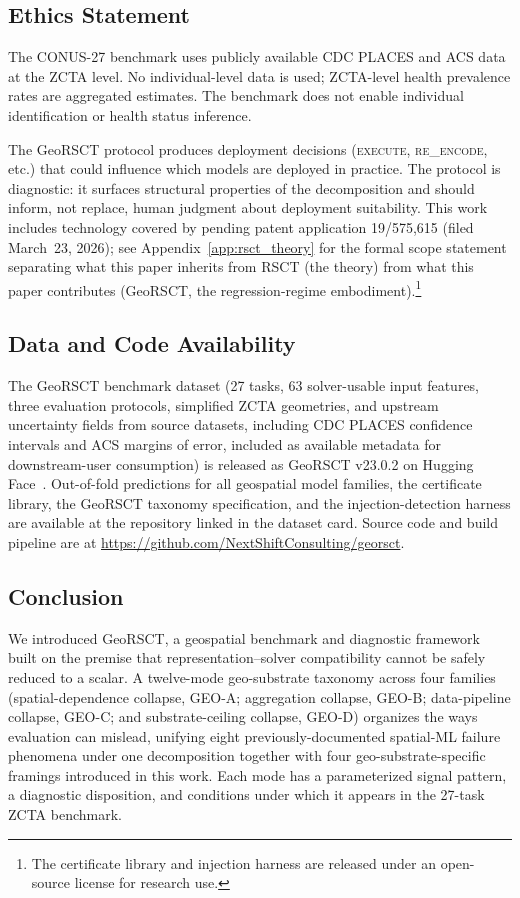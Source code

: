 \documentclass{article}
\begin{document}
\subsection{Ethics Statement}

The CONUS-27 benchmark uses publicly available CDC PLACES and ACS data at the ZCTA level. No individual-level data is used; ZCTA-level health prevalence rates are aggregated estimates. The benchmark does not enable individual identification or health status inference.

The GeoRSCT protocol produces deployment decisions (\textsc{execute}, \textsc{re\_encode}, etc.) that could influence which models are deployed in practice. The protocol is diagnostic: it surfaces structural properties of the decomposition and should inform, not replace, human judgment about deployment suitability. This work includes technology covered by pending patent application 19/575,615 (filed March~23, 2026); see Appendix~\ref{app:rsct_theory} for the formal scope statement separating what this paper inherits from RSCT (the theory) from what this paper contributes (GeoRSCT, the regression-regime embodiment).\footnote{The certificate library and injection harness are released under an open-source license for research use.}

\subsection{Data and Code Availability}

The GeoRSCT benchmark dataset (27 tasks, 63 solver-usable input features, three evaluation protocols, simplified ZCTA geometries, and upstream uncertainty fields from source datasets, including CDC PLACES confidence intervals and ACS margins of error, included as available metadata for downstream-user consumption) is released as GeoRSCT v23.0.2 on Hugging Face~\citep{geocert2026}. Out-of-fold predictions for all geospatial model families, the certificate library, the GeoRSCT taxonomy specification, and the injection-detection harness are available at the repository linked in the dataset card. Source code and build pipeline are at \url{https://github.com/NextShiftConsulting/georsct}.

\subsection{Conclusion}

We introduced GeoRSCT, a geospatial benchmark and diagnostic framework built on the premise that representation--solver compatibility cannot be safely reduced to a scalar. A twelve-mode geo-substrate taxonomy across four families (spatial-dependence collapse, GEO-A; aggregation collapse, GEO-B; data-pipeline collapse, GEO-C; and substrate-ceiling collapse, GEO-D) organizes the ways evaluation can mislead, unifying eight previously-documented spatial-ML failure phenomena under one decomposition together with four geo-substrate-specific framings introduced in this work. Each mode has a parameterized signal pattern, a diagnostic disposition, and conditions under which it appears in the 27-task ZCTA benchmark.
\end{document}
